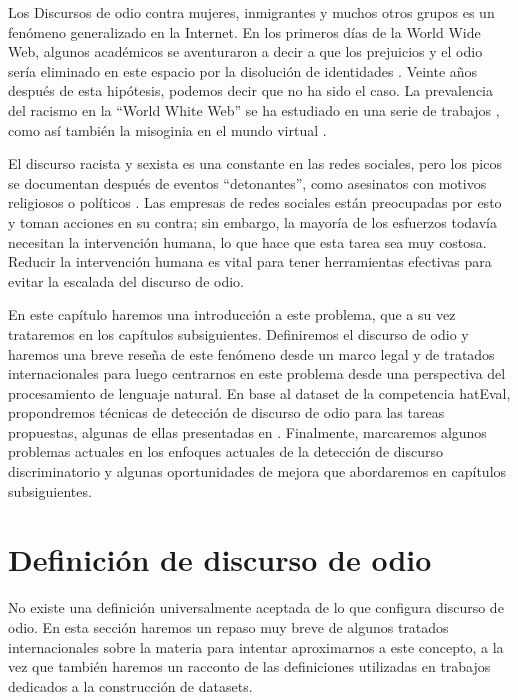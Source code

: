 Los Discursos de odio contra mujeres, inmigrantes y muchos otros grupos es un fenómeno generalizado en la Internet. En los primeros días de la World Wide Web, algunos académicos se aventuraron a decir a que los prejuicios y el odio sería eliminado en este espacio por la disolución de identidades \cite{levy2001cyberculture, rheingold1993virtual}. Veinte años después de esta hipótesis, podemos
decir que no ha sido el caso. La prevalencia del racismo en la ``World White Web'' se ha estudiado en una serie de trabajos \cite{adams2005white, kettrey2014staking}, como así también la misoginia en el mundo virtual \cite{filipovic2007blogging, mantilla2013gendertrolling}.

El discurso racista y sexista es una constante en las redes sociales, pero los picos se documentan después de eventos ``detonantes'', como asesinatos con motivos religiosos o políticos \cite{burnap2015cyber}. Las empresas de redes sociales están preocupadas por esto y toman acciones en su contra; sin embargo, la mayoría de los esfuerzos todavía necesitan la intervención humana, lo que hace que esta tarea sea muy costosa. Reducir la intervención humana es vital para tener herramientas efectivas para evitar la escalada del discurso de odio.


En este capítulo haremos una introducción a este problema, que a su vez trataremos en los capítulos subsiguientes. Definiremos el discurso de odio y haremos una breve reseña de este fenómeno desde un marco legal y de tratados internacionales para luego centrarnos en este problema desde una perspectiva del procesamiento de lenguaje natural. En base al dataset de la competencia hatEval\cite{hateval2019semeval}, propondremos técnicas de detección de discurso de odio para las tareas propuestas, algunas de ellas presentadas en \citet{atalaya_tass2018}. Finalmente, marcaremos algunos problemas actuales en los enfoques actuales de la detección de discurso discriminatorio y algunas oportunidades de mejora que abordaremos en capítulos subsiguientes.


\section{Definición de discurso de odio}

\label{sec:hate_speech_definitions}

No existe una definición universalmente aceptada de lo que configura discurso de odio. En esta sección haremos un repaso muy breve de algunos tratados internacionales sobre la materia para intentar aproximarnos a este concepto, a la vez que también haremos un racconto de las definiciones utilizadas en trabajos dedicados a la construcción de datasets.


